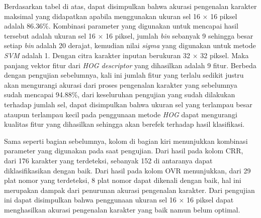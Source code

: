 \noindent Berdasarkan tabel di atas, dapat disimpulkan bahwa akurasi pengenalan karakter maksimal yang didapatkan apabila menggunakan ukuran sel 16 $\times$ 16 piksel adalah 86.36\%. Kombinasi parameter yang digunakan untuk mencapai hasil tersebut adalah ukuran sel 16 $\times$ 16 piksel, jumlah \textit{bin} sebanyak 9 sehingga besar setiap \textit{bin} adalah 20 derajat, kemudian nilai \textit{sigma} yang digunakan untuk metode \textit{SVM} adalah 1. Dengan citra karakter inputan berukuran 32 $\times$ 32 piksel. Maka panjang vektor fitur dari \textit{HOG descriptor} yang dihasilkan adalah 9 fitur. Berbeda dengan pengujian sebelumnya, kali ini jumlah fitur yang terlalu sedikit justru akan mengurangi akurasi dari proses pengenalan karakter yang sebelumnya sudah mencapai 94.88\%, dari keseluruhan pengujian yang sudah dilakukan terhadap jumlah sel, dapat disimpulkan bahwa ukuran sel yang terlampau besar ataupun terlampau kecil pada penggunaan metode \textit{HOG} dapat mengurangi kualitas fitur yang dihasilkan sehingga akan berefek terhadap hasil klasifikasi.

\noindent Sama seperti bagian sebelumnya, kolom di bagian kiri menunjukkan kombinasi parameter yang digunakan pada saat pengujian. Dari hasil pada kolom CRR, dari 176 karakter yang terdeteksi, sebanyak 152 di antaranya dapat diklasifikasikan dengan baik. Dari hasil pada kolom OVR menunjukkan, dari 29 plat nomor yang terdeteksi, 8 plat nomor dapat dikenali dengan baik, hal ini merupakan dampak dari penurunan akurasi pengenalan karakter. Dari pengujian ini dapat  disimpulkan bahwa penggunaan ukuran sel 16 $\times$ 16 piksel dapat menghasilkan akurasi pengenalan karakter yang baik namun belum optimal.\\

\newpage